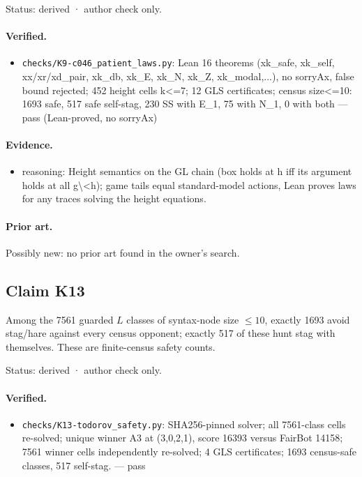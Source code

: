 \documentclass{article}
\begin{document}
Status: derived · author check only.

\paragraph{Verified.}
\begin{itemize}
\item \texttt{checks/K9-c046\_patient\_laws.py}: Lean 16 theorems (xk\_safe, xk\_self, xx/xr/xd\_pair, xk\_db, xk\_E, xk\_N, xk\_Z, xk\_modal,...), no sorryAx, false bound rejected; 452 height cells k\textless{}=7; 12 GLS certificates; census size\textless{}=10: 1693 safe, 517 safe self-stag, 230 SS with E\_1, 75 with N\_1, 0 with both --- pass (Lean-proved, no sorryAx)
\end{itemize}

\paragraph{Evidence.}
\begin{itemize}
\item reasoning: Height semantics on the GL chain (box holds at h iff its argument holds at all g\textbackslash{}\textless{}h); game tails equal standard-model actions, Lean proves laws for any traces solving the height equations.
\end{itemize}

\paragraph{Prior art.} Possibly new: no prior art found in the owner's search.

\subsection*{Claim K13}

Among the 7561 guarded $L$ classes of syntax-node size $\le10$, exactly 1693 avoid stag/hare against every census opponent; exactly 517 of these hunt stag with themselves. These are finite-census safety counts.

Status: derived · author check only.

\paragraph{Verified.}
\begin{itemize}
\item \texttt{checks/K13-todorov\_safety.py}: SHA256-pinned solver; all 7561-class cells re-solved; unique winner A3 at (3,0,2,1), score 16393 versus FairBot 14158; 7561 winner cells independently re-solved; 4 GLS certificates; 1693 census-safe classes, 517 self-stag. --- pass
\end{itemize}
\end{document}
